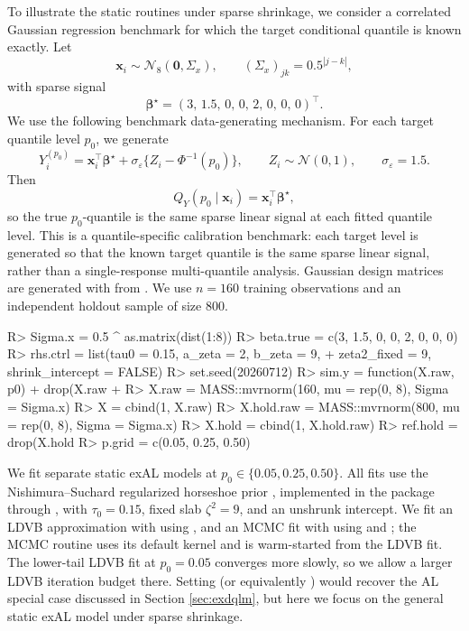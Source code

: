 \documentclass{jss}
\newcommand{\vect}[1]{\boldsymbol{#1}}
\newcommand{\mat}[1]{\mathbf{#1}}
\newcommand{\N}{\mathcal{N}}
\begin{document}
To illustrate the static routines under sparse shrinkage, we consider a correlated Gaussian regression benchmark for which the target conditional quantile is known exactly. Let
\[
\mat{x}_i \sim \N_8(\mat{0}, \Sigma_x),\qquad (\Sigma_x)_{jk} = 0.5^{|j-k|},
\]
with sparse signal
\[
\vect{\beta}^\star = (3,\,1.5,\,0,\,0,\,2,\,0,\,0,\,0)^\top.
\]
We use the following benchmark data-generating mechanism.
For each target quantile level \(p_0\), we generate
\[
Y_i^{(p_0)} = \mat{x}_i^\top \vect{\beta}^\star + \sigma_\varepsilon \{Z_i - \Phi^{-1}(p_0)\},
\qquad Z_i \sim \N(0,1),\qquad \sigma_\varepsilon = 1.5.
\]
Then
\[
Q_Y(p_0 \mid \mat{x}_i) = \mat{x}_i^\top \vect{\beta}^\star,
\]
so the true \(p_0\)-quantile is the same sparse linear signal at each fitted quantile level. This is a quantile-specific calibration benchmark: each target level is generated so that the known target quantile is the same sparse linear signal, rather than a single-response multi-quantile analysis. Gaussian design matrices are generated with  from  \citep{MASS}. We use \(n = 160\) training observations and an independent holdout sample of size \(800\).

\begin{CodeChunk}
\begin{CodeInput}
R> Sigma.x = 0.5 ^ as.matrix(dist(1:8))
R> beta.true = c(3, 1.5, 0, 0, 2, 0, 0, 0)
R> rhs.ctrl = list(tau0 = 0.15, a_zeta = 2, b_zeta = 9,
+                  zeta2_fixed = 9, shrink_intercept = FALSE)
R> set.seed(20260712)
R> sim.y = function(X.raw, p0) {
+     drop(X.raw %
+   }
R> X.raw = MASS::mvrnorm(160, mu = rep(0, 8), Sigma = Sigma.x)
R> X = cbind(1, X.raw)
R> X.hold.raw = MASS::mvrnorm(800, mu = rep(0, 8), Sigma = Sigma.x)
R> X.hold = cbind(1, X.hold.raw)
R> ref.hold = drop(X.hold %
R> p.grid = c(0.05, 0.25, 0.50)
\end{CodeInput}
\end{CodeChunk}

We fit separate static exAL models at \(p_0 \in \{0.05,0.25,0.50\}\). All fits use the Nishimura--Suchard regularized horseshoe prior \citep{nishimura2023shrunken}, implemented in the package through , with \(\tau_0 = 0.15\), fixed slab \(\zeta^2 = 9\), and an unshrunk intercept. We fit an LDVB approximation with  using , and an MCMC fit with  using  and ; the MCMC routine uses its default  kernel and is warm-started from the LDVB fit. The lower-tail LDVB fit at \(p_0 = 0.05\) converges more slowly, so we allow a larger LDVB iteration budget there. Setting  (or equivalently ) would recover the AL special case discussed in Section \ref{sec:exdqlm}, but here we focus on the general static exAL model under sparse  shrinkage.
\end{document}
